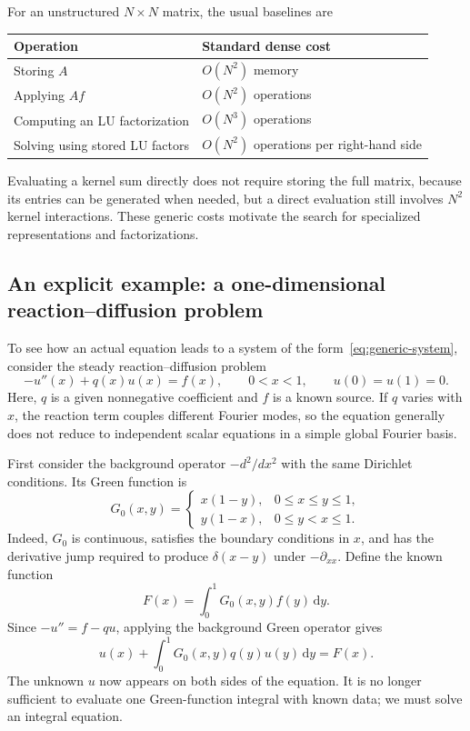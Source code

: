 \documentclass[11pt,a4paper]{article}
\numberwithin{equation}{section}
\begin{document}
For an unstructured $N\times N$ matrix, the usual baselines are
\begin{center}
\begin{tabular}{@{}ll@{}}
Operation & Standard dense cost \\
\hline
Storing $A$ & $O(N^2)$ memory \\
Applying $Af$ & $O(N^2)$ operations \\
Computing an LU factorization & $O(N^3)$ operations \\
Solving using stored LU factors & $O(N^2)$ operations per right-hand side
\end{tabular}
\end{center}
Evaluating a kernel sum directly does not require storing the full matrix, because its entries can be generated when needed, but a direct evaluation still involves $N^2$ kernel interactions. These generic costs motivate the search for specialized representations and factorizations.

\subsection{An explicit example: a one-dimensional reaction--diffusion problem}
\label{subsec:reaction-diffusion}

To see how an actual equation leads to a system of the form~\eqref{eq:generic-system}, consider the steady reaction--diffusion problem
\begin{equation}
    -u''(x)+q(x)u(x)=f(x),\qquad 0<x<1,
    \qquad u(0)=u(1)=0.
    \label{eq:reaction-diffusion}
\end{equation}
Here, $q$ is a given nonnegative coefficient and $f$ is a known source. If $q$ varies with $x$, the reaction term couples different Fourier modes, so the equation generally does not reduce to independent scalar equations in a simple global Fourier basis.

First consider the background operator $-d^2/dx^2$ with the same Dirichlet conditions. Its Green function is
\begin{equation}
    G_0(x,y)=
    \begin{cases}
        x(1-y), & 0\leq x\leq y\leq1,\\
        y(1-x), & 0\leq y<x\leq1.
    \end{cases}
    \label{eq:dirichlet-green}
\end{equation}
Indeed, $G_0$ is continuous, satisfies the boundary conditions in $x$, and has the derivative jump required to produce $\delta(x-y)$ under $-\partial_{xx}$. Define the known function
\begin{equation}
    F(x)=\int_0^1G_0(x,y)f(y)\,\mathrm{d}y.
    \label{eq:reaction-source}
\end{equation}
Since $-u''=f-qu$, applying the background Green operator gives
\begin{equation}
    u(x)+\int_0^1G_0(x,y)q(y)u(y)\,\mathrm{d}y=F(x).
    \label{eq:reaction-integral}
\end{equation}
The unknown $u$ now appears on both sides of the equation. It is no longer sufficient to evaluate one Green-function integral with known data; we must solve an integral equation.
\end{document}
